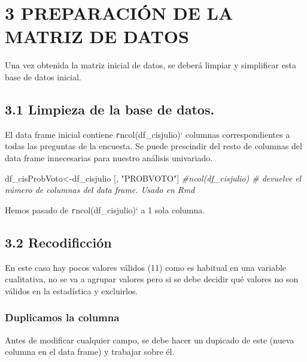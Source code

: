 \documentclass[
]{article}
\newenvironment{Shaded}{\begin{snugshade}}{\end{snugshade}}
\newcommand{\CommentTok}[1]{\textcolor[rgb]{0.56,0.35,0.01}{\textit{#1}}}
\newcommand{\NormalTok}[1]{#1}
\newcommand{\OtherTok}[1]{\textcolor[rgb]{0.56,0.35,0.01}{#1}}
\newcommand{\StringTok}[1]{\textcolor[rgb]{0.31,0.60,0.02}{#1}}
\begin{document}
\hypertarget{preparaciuxf3n-de-la-matriz-de-datos}{%
\section{3 PREPARACIÓN DE LA MATRIZ DE
DATOS}\label{preparaciuxf3n-de-la-matriz-de-datos}}

Una vez obtenida la matriz inicial de datos, se deberá limpiar y
simplificar esta base de datos inicial.

\hypertarget{limpieza-de-la-base-de-datos.}{%
\subsection{3.1 Limpieza de la base de
datos.}\label{limpieza-de-la-base-de-datos.}}

El data frame inicial contiene \texttt{r}ncol(df\_cisjulio)` columnas
correspondientes a todas las preguntas de la encuesta. Se puede
prescindir del resto de columnas del data frame innecesarias para
nuestro análisis univariado.

\begin{Shaded}
\begin{Highlighting}[]
\NormalTok{df\_cisProbVoto}\OtherTok{\textless{}{-}}\NormalTok{df\_cisjulio [, }\StringTok{"PROBVOTO"}\NormalTok{]}
\CommentTok{\#ncol(df\_cisjulio) \# devuelve el número de columnas del data frame. Usado en Rmd}
\end{Highlighting}
\end{Shaded}

Hemos pasado de \texttt{r}ncol(df\_cisjulio)` a 1 sola columna.

\hypertarget{recodificciuxf3n}{%
\subsection{3.2 Recodificción}\label{recodificciuxf3n}}

En este caso hay pocos valores válidos (11) como es habitual en una
variable cualitativa, no se va a agrupar valores pero si se debe decidir
qué valores no son válidos en la estadística y excluirlos.

\hypertarget{duplicamos-la-columna}{%
\subsubsection{Duplicamos la columna}\label{duplicamos-la-columna}}

Antes de modificar cualquier campo, se debe hacer un dupicado de este
(nueva columna en el data frame) y trabajar sobre él.
\end{document}
